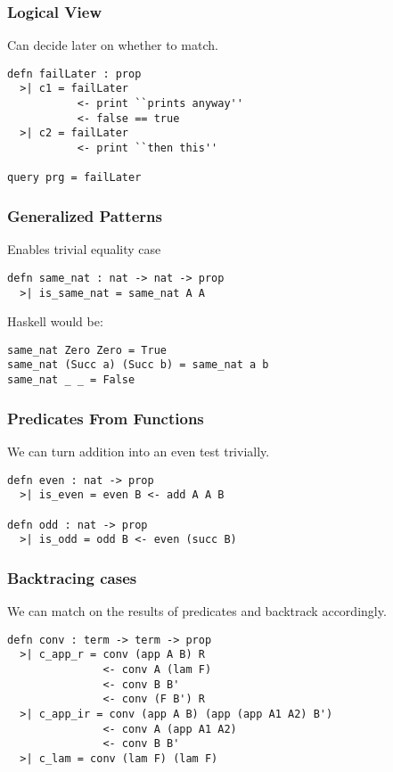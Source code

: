 
\begin{frame}[fragile]
\frametitle{Logical View}

Can decide later on whether to match.

\begin{lstlisting}
defn failLater : prop 
  >| c1 = failLater 
           <- print ``prints anyway'' 
           <- false == true
  >| c2 = failLater
           <- print ``then this''

query prg = failLater
\end{lstlisting}
\end{frame}


\begin{frame}[fragile]
\frametitle{Generalized Patterns}

Enables trivial equality case

\begin{lstlisting}
defn same_nat : nat -> nat -> prop
  >| is_same_nat = same_nat A A
\end{lstlisting}

Haskell would be: 

\begin{lstlisting}
same_nat Zero Zero = True
same_nat (Succ a) (Succ b) = same_nat a b
same_nat _ _ = False
\end{lstlisting}
\end{frame}


\begin{frame}[fragile]
\frametitle{Predicates From Functions}

We can turn addition into an even test trivially.

\begin{lstlisting}
defn even : nat -> prop
  >| is_even = even B <- add A A B

defn odd : nat -> prop
  >| is_odd = odd B <- even (succ B)
\end{lstlisting}
\end{frame}


\begin{frame}[fragile]
\frametitle{Backtracing cases}

We can match on the results of predicates and backtrack accordingly.

\begin{lstlisting}
defn conv : term -> term -> prop
  >| c_app_r = conv (app A B) R
               <- conv A (lam F)
               <- conv B B'
               <- conv (F B') R
  >| c_app_ir = conv (app A B) (app (app A1 A2) B')
               <- conv A (app A1 A2)
               <- conv B B'
  >| c_lam = conv (lam F) (lam F) 
\end{lstlisting}
\end{frame}

